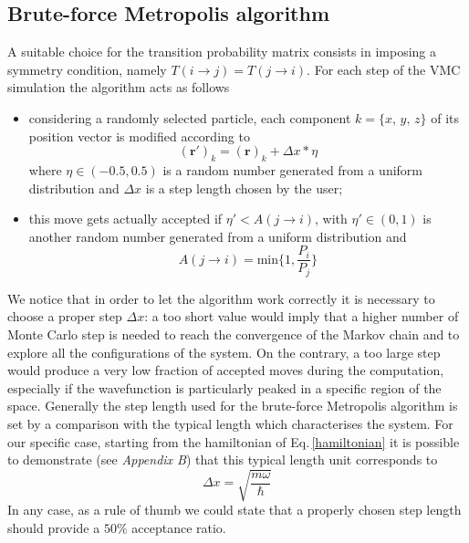 \subsection{Brute-force Metropolis algorithm}
A suitable choice for the transition probability matrix consists in imposing a symmetry condition, namely $T( i\rightarrow j) = T(j \rightarrow i)$. For each step of the VMC simulation the algorithm acts as follows
\begin{itemize}
    \item considering a randomly selected particle, each  component $k = \{x,\,y,\,z\}$ of its position vector is modified according to
    \begin{equation*}
        (\bm{r}')_k = (\bm{r})_k + \Delta x \ast \eta
    \end{equation*}
    where $\eta \in (-0.5, 0.5)$ is a random number generated from a uniform distribution and $\Delta x$ is a step length chosen by the user;
    \item this move gets actually accepted if $\eta' < A(j\rightarrow i)$, with $\eta' \in (0,1)$ is another random number generated from a uniform distribution and
    \begin{equation*}
        A(j \rightarrow i) = \text{min} \bigg\{ 1, \frac{P_i}{P_j} \bigg\}
    \end{equation*}
\end{itemize}
We notice that in order to let the algorithm work correctly it is necessary to choose a proper step $\Delta x$: a too short value would imply that a higher number of Monte Carlo step is needed to reach the convergence of the Markov chain and to explore all the configurations of the system. On the contrary, a too large step would produce a very low fraction of accepted moves during the computation, especially if the wavefunction is particularly peaked in a specific region of the space. Generally the step length used for the brute-force Metropolis algorithm is set by a comparison with the typical length which characterises the system. For our specific case, starting from the hamiltonian of Eq.\,\ref{hamiltonian} it is possible to demonstrate (see \textit{Appendix B}) that this typical length unit corresponds to 
\begin{equation*}
    \Delta x = \sqrt{\frac{m \omega}{\hbar}}
\end{equation*}
In any case, as a rule of thumb we could state that a properly chosen step length should provide a $50\%$ acceptance ratio. 






